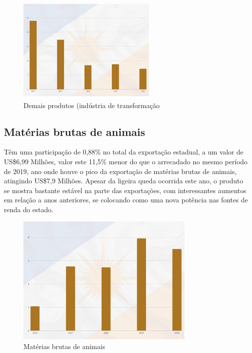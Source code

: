 \begin{figure} [h] \caption{Demais produtos (indústria de transformação}
	\includegraphics[width=\linewidth]{fig/transf1.png}
\end{figure}
\newpage 

\subsection {Matérias brutas de animais}
Têm uma participação de 0,88\% no total da exportação estadual, a um valor de US\$6,99 Milhões, valor este 11,5\% menor do que o arrecadado no mesmo período de 2019, ano onde houve o pico da exportação de matérias brutas de animais, atingindo US\$7,9 Milhões. Apesar da ligeira queda ocorrida este ano, o produto se mostra bastante estável na parte das exportações, com interessantes aumentos em relação a anos anteriores, se colocando como uma nova potência nas fontes de renda do estado.

\begin{figure} [h] \caption{Matérias brutas de animais}
	\includegraphics[width=\linewidth]{fig/ultimo.png}
\end{figure}
\newpage 

